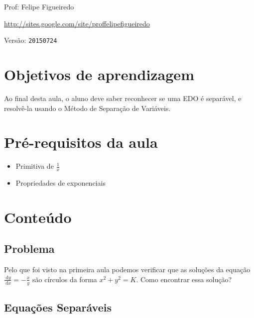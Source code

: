 \documentclass[a4paper]{article}
\newcommand{\ud}{\mathrm{\ d}}
\begin{document}
\parbox[c]{.825\textwidth}{\raggedright%
{Prof: Felipe Figueiredo\par}
{\url{http://sites.google.com/site/proffelipefigueiredo}\par}
}

Versão: \verb|20150724|



\section{Objetivos de aprendizagem}

Ao final desta aula, o aluno deve saber reconhecer se uma EDO é
separável, e resolvê-la usando o Método de Separação de Variáveis.

\section{Pré-requisitos da aula}

\begin{itemize}
\item Primitiva de $\frac{1}{x}$
\item Propriedades de exponenciais
\end{itemize}

\section{Conteúdo}

\subsection{Problema}

Pelo que foi visto na primeira aula podemos verificar que as soluções
da equação $\frac{\ud y}{\ud x} = -\frac{x}{y}$ são círculos da forma
$x^2 + y^2 = K$. Como encontrar essa solução?

\subsection{Equações Separáveis}
\end{document}
